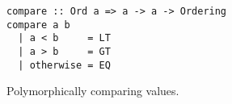 \begin{verbatim}
compare :: Ord a => a -> a -> Ordering
compare a b
  | a < b     = LT
  | a > b     = GT
  | otherwise = EQ
\end{verbatim}
\caption{Polymorphically comparing values.}
